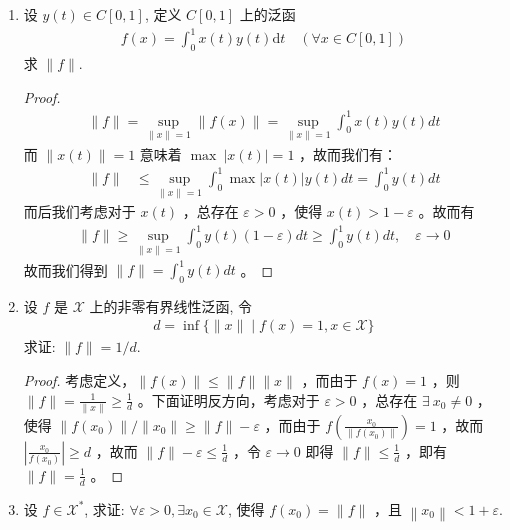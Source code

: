 \begin{enumerate}[leftmargin=2cm, label=\arabic*]
\begin{enumerate}[leftmargin=1cm, label=(\arabic*)]
			\begin{proof}
				而我们由这几道题，可以得出 $\sup\limits_{\|x\| < 1} f(x) = \|f\|$ ，考虑 $\|y\| < \delta$ ，则存在对应的 $\|x\| = 1$ ，使得 $y = \frac{x\delta}{\|x\|}$ ，则有 $\sup\limits_{\|y\|<\delta} f(y) = \frac{\delta}{\|x\|} \sup\limits_{\|x\| = 1} f(x) = \delta \|f\|$ 。
			\end{proof}
		\end{enumerate}
		\item 设 $y(t) \in C[0,1]$, 定义 $C[0,1]$ 上的泛函
		\begin{align*}
			f(x)=\int_{0}^{1} x(t) y(t) \mathrm{d} t \quad(\forall x \in C[0,1])
		\end{align*}
		求 $\|f\|$.
		\begin{proof}
			\begin{align*}
				\|f\| = \sup\limits_{\|x\| = 1} \|f(x)\| = \sup\limits_{\|x\| = 1} \int_0^1 x(t)y(t)dt
			\end{align*}
			而 $\|x(t)\| = 1$ 意味着 $\max\ |x(t)| = 1$ ，故而我们有：
			\begin{align*}
				\|f\| &\leqslant \sup\limits_{\|x\| = 1} \int_0^1 \max|x(t)| y(t) dt = \int_0^1 y(t) dt 
			\end{align*}
			而后我们考虑对于 $x(t)$ ，总存在 $\varepsilon > 0$ ，使得 $x(t) > 1 - \varepsilon$ 。故而有
			\begin{align*}
				\|f\| \geqslant \sup\limits_{\|x\| = 1}  \int_0^1 y(t) (1-\varepsilon) dt \geqslant \int_0^1 y(t)dt,\quad \varepsilon \to 0
			\end{align*}
			故而我们得到 $\|f\| = \int_0^1 y(t) dt$ 。
		\end{proof}
		\item 设 $f$ 是 $\mathscr{X}$ 上的非零有界线性泛函, 令
		\begin{align*}
			d =\inf \{\|x\| \mid f(x)=1, x \in \mathscr{X}\}
		\end{align*}
		求证: $\|f\|=1 / d$.
		\begin{proof}
			考虑定义，$\|f(x)\| \leqslant \|f\|\|x\|$ ，而由于 $f(x) = 1$ ，则 $\|f\| = \frac{1}{\|x\|} \geqslant \frac{1}{d}$ 。下面证明反方向，考虑对于 $\varepsilon > 0$ ，总存在 $\exists\ x_0 \neq 0$ ，使得 $\|f(x_0)\| / \|x_0\| \geqslant \|f\| - \varepsilon$ ，而由于 $f\left(\frac{x_0}{\|f(x_0)\|}\right) = 1$ ，故而 $\left|\frac{x_0}{f(x_0)}\right| \geqslant d$ ，故而 $\|f\| - \varepsilon \leqslant \frac{1}{d}$ ，令 $\varepsilon\to 0$ 即得 $\|f\| \leqslant \frac{1}{d}$ ，即有 $\|f\| = \frac{1}{d}$ 。 
		\end{proof}
		\item 设 $f \in \mathscr{X}^{*}$, 求证: $\forall \varepsilon>0, \exists x_{0} \in \mathscr{X}$, 使得 $f\left(x_{0}\right)=\|f\|$ ，且 $\left\|x_{0}\right\|<1+\varepsilon$.

\end{enumerate}
